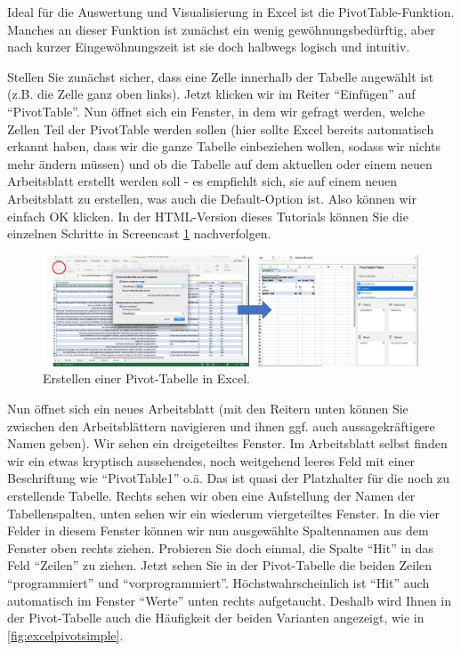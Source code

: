 \documentclass[]{article}
\begin{document}
Ideal für die Auswertung und Visualisierung in Excel ist die
PivotTable-Funktion. Manches an dieser Funktion ist zunächst ein wenig
gewöhnungsbedürftig, aber nach kurzer Eingewöhnungszeit ist sie doch
halbwegs logisch und intuitiv.

Stellen Sie zunächst sicher, dass eine Zelle innerhalb der Tabelle
angewählt ist (z.B. die Zelle ganz oben links). Jetzt klicken wir im
Reiter ``Einfügen'' auf ``PivotTable''. Nun öffnet sich ein Fenster, in
dem wir gefragt werden, welche Zellen Teil der PivotTable werden sollen
(hier sollte Excel bereits automatisch erkannt haben, dass wir die ganze
Tabelle einbeziehen wollen, sodass wir nichts mehr ändern müssen) und ob
die Tabelle auf dem aktuellen oder einem neuen Arbeitsblatt erstellt
werden soll - es empfiehlt sich, sie auf einem neuen Arbeitsblatt zu
erstellen, was auch die Default-Option ist. Also können wir einfach OK
klicken. In der HTML-Version dieses Tutorials können Sie die einzelnen
Schritte in Screencast \ref{fig:excelpivot} nachverfolgen.

\begin{figure}
\includegraphics[width=6.66in]{docs/fig/excelpivot} \caption{Erstellen einer Pivot-Tabelle in Excel.}\label{fig:excelpivot}
\end{figure}

Nun öffnet sich ein neues Arbeitsblatt (mit den Reitern unten können Sie
zwischen den Arbeitsblättern navigieren und ihnen ggf. auch
aussagekräftigere Namen geben). Wir sehen ein dreigeteiltes Fenster. Im
Arbeitsblatt selbst finden wir ein etwas kryptisch aussehendes, noch
weitgehend leeres Feld mit einer Beschriftung wie ``PivotTable1'' o.ä.
Das ist quasi der Platzhalter für die noch zu erstellende Tabelle.
Rechts sehen wir oben eine Aufstellung der Namen der Tabellenspalten,
unten sehen wir ein wiederum viergeteiltes Fenster. In die vier Felder
in diesem Fenster können wir nun ausgewählte Spaltennamen aus dem
Fenster oben rechts ziehen. Probieren Sie doch einmal, die Spalte
``Hit'' in das Feld ``Zeilen'' zu ziehen. Jetzt sehen Sie in der
Pivot-Tabelle die beiden Zeilen ``programmiert'' und
``vorprogrammiert''. Höchstwahrscheinlich ist ``Hit'' auch automatisch
im Fenster ``Werte'' unten rechts aufgetaucht. Deshalb wird Ihnen in der
Pivot-Tabelle auch die Häufigkeit der beiden Varianten angezeigt, wie in
\ref{fig:excelpivotsimple}.
\end{document}
